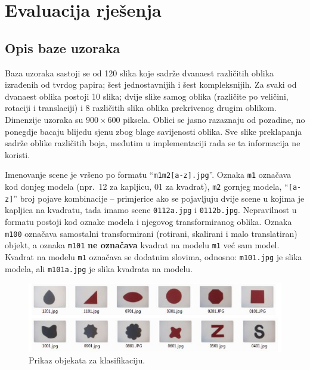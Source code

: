 \documentclass[lmodern, utf8, seminar, numeric]{fer}
\begin{document}
\chapter{Evaluacija rješenja}
\section{Opis baze uzoraka}
Baza uzoraka sastoji se od 120 slika koje sadrže dvanaest različitih oblika
izrađenih od tvrdog papira; šest jednostavnijih i šest kompleksnijih. Za svaki
od dvanaest oblika postoji 10 slika; dvije slike samog oblika (različite po
veličini, rotaciji i translaciji) i 8 različitih slika oblika prekrivenog drugim
oblikom. Dimenzije uzoraka su $900 \times 600$ piksela. Oblici se jasno
razaznaju od pozadine, no ponegdje bacaju blijedu sjenu zbog blage savijenosti
oblika. Sve slike preklapanja sadrže oblike različitih boja, međutim u
implementaciji rada se ta informacija ne koristi.

Imenovanje scene je vršeno po formatu ``\texttt{m1m2[a-z].jpg}''. Oznaka
\texttt{m1} označava kod donjeg modela (npr.\ 12 za kapljicu, 01 za kvadrat),
\texttt{m2} gornjeg modela, ``\texttt{[a-z]}'' broj pojave kombinacije --
primjerice ako se pojavljuju dvije scene u kojima je kapljica na kvadratu, tada
imamo scene \texttt{0112a.jpg} i \texttt{0112b.jpg}. Nepravilnost u formatu
postoji kod oznake modela i njegovog transformiranog oblika. Oznaka
\texttt{m100} označava samostalni transformirani (rotirani, skalirani i malo
translatiran) objekt, a oznaka \texttt{m101} \textbf{ne označava} kvadrat na modelu
\texttt{m1} već sam model. Kvadrat na modelu \texttt{m1} označava se dodatnim
slovima, odnosno: \texttt{m101.jpg} je slika modela, ali \texttt{m101a.jpg} je
slika kvadrata na modelu.

\begin{figure}[htb]
\begin{center}
\includegraphics[width=13.5cm]{resources/baza.png}
\end{center}
\caption{Prikaz objekata za klasifikaciju.} 
\label{fig:baza}
\end{figure}
\end{document}
